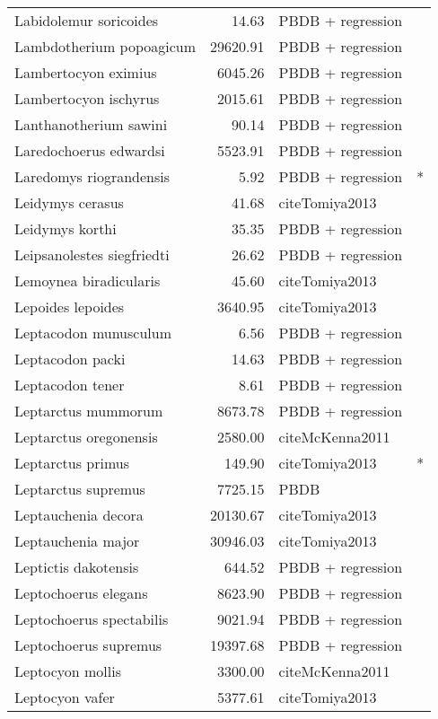 \begin{table}[ht]
\begin{tabular}{lrll}
  Labidolemur soricoides & 14.63 & PBDB + regression &  \\ 
  Lambdotherium popoagicum & 29620.91 & PBDB + regression &  \\ 
  Lambertocyon eximius & 6045.26 & PBDB + regression &  \\ 
  Lambertocyon ischyrus & 2015.61 & PBDB + regression &  \\ 
  Lanthanotherium sawini & 90.14 & PBDB + regression &  \\ 
  Laredochoerus edwardsi & 5523.91 & PBDB + regression &  \\ 
  Laredomys riograndensis & 5.92 & PBDB + regression & * \\ 
  Leidymys cerasus & 41.68 & cite{Tomiya2013} &  \\ 
  Leidymys korthi & 35.35 & PBDB + regression &  \\ 
  Leipsanolestes siegfriedti & 26.62 & PBDB + regression &  \\ 
  Lemoynea biradicularis & 45.60 & cite{Tomiya2013} &  \\ 
  Lepoides lepoides & 3640.95 & cite{Tomiya2013} &  \\ 
  Leptacodon munusculum & 6.56 & PBDB + regression &  \\ 
  Leptacodon packi & 14.63 & PBDB + regression &  \\ 
  Leptacodon tener & 8.61 & PBDB + regression &  \\ 
  Leptarctus mummorum & 8673.78 & PBDB + regression &  \\ 
  Leptarctus oregonensis & 2580.00 & cite{McKenna2011} &  \\ 
  Leptarctus primus & 149.90 & cite{Tomiya2013} & * \\ 
  Leptarctus supremus & 7725.15 & PBDB &  \\ 
  Leptauchenia decora & 20130.67 & cite{Tomiya2013} &  \\ 
  Leptauchenia major & 30946.03 & cite{Tomiya2013} &  \\ 
  Leptictis dakotensis & 644.52 & PBDB + regression &  \\ 
  Leptochoerus elegans & 8623.90 & PBDB + regression &  \\ 
  Leptochoerus spectabilis & 9021.94 & PBDB + regression &  \\ 
  Leptochoerus supremus & 19397.68 & PBDB + regression &  \\ 
  Leptocyon mollis & 3300.00 & cite{McKenna2011} &  \\ 
  Leptocyon vafer & 5377.61 & cite{Tomiya2013} &  \\ 

\end{tabular}
\end{table}

